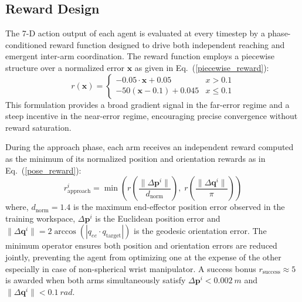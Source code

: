 \documentclass[lettersize,journal]{IEEEtran}
\begin{document}
\subsection{Reward Design}
\label{reward_design}
The 7-D action output of each agent is evaluated at every timestep by a phase-conditioned reward function designed to drive both independent reaching and emergent inter-arm coordination.\newline
The reward function employs a piecewise structure over a normalized error $\mathbf{x}$ as given in Eq.~(\ref{piecewise_reward}):
\begin{equation}
r(\mathbf{x}) = 
\begin{cases} 
      -0.05\cdot\mathbf{x} + 0.05 &  x > 0.1 \\
      -50(\mathbf{x}-0.1) + 0.045 &  x \leq 0.1
\end{cases}
\label{piecewise_reward}
\end{equation}
This formulation provides a broad gradient signal in the far-error regime and a steep incentive in the near-error regime, encouraging precise convergence without reward saturation.

\noindent During the approach phase, each arm receives an independent reward computed as the minimum of its normalized position and orientation rewards as in Eq.~(\ref{pose_reward}):
\begin{equation}
r^{i}_{\text{approach}} = \min \left(
r\left(\frac{\lVert \Delta \mathbf{p}^i \rVert}{d_\text{norm}}\right),\;
r\left(\frac{\lVert \Delta \mathbf{q}^i \rVert}{\pi}\right)
\right)
\label{pose_reward}
\end{equation}
where, $d_\text{norm} = 1.4$ is the maximum end-effector position error observed in the training workspace,  $\Delta \mathbf{p}^i$ is the Euclidean position error and $\lVert \Delta \mathbf{q}^i \rVert = 2 \arccos \left( \left| q_{ee} \cdot q_{\text{target}} \right| \right)$ is the geodesic orientation error. The minimum operator ensures both position and orientation errors are reduced jointly, preventing the agent from optimizing one at the expense of the other especially in case of non-spherical wrist manipulator. A success bonus $r_\text{success}\approx5$ is awarded when both arms simultaneously satisfy $\Delta \mathbf{p}^i<0.002~m$ and $\lVert \Delta \mathbf{q}^i\rVert<0.1~rad$.
\end{document}
